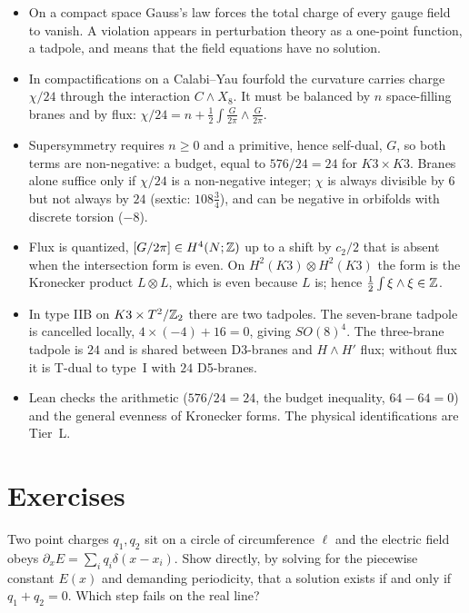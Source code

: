 \begin{summarybox}
\begin{itemize}[leftmargin=1.5em]
\item On a compact space Gauss's law forces the total charge of every gauge field to vanish.
 A violation appears in perturbation theory as a one-point function, a tadpole, and means
 that the field equations have no solution.
\item In compactifications on a Calabi--Yau fourfold the curvature carries charge
 $\chi/24$ through the interaction $C\wedge X_8$. It must be balanced by $n$ space-filling
 branes and by flux: $\chi/24=n+\tfrac12\int\frac G{2\pi}\wedge\frac G{2\pi}$.
\item Supersymmetry requires $n\ge0$ and a primitive, hence self-dual, $G$, so both terms are
 non-negative: a budget, equal to $576/24=24$ for $K3\times K3$. Branes alone suffice only if
 $\chi/24$ is a non-negative integer;
 $\chi$ is always divisible by $6$ but not always by $24$ (sextic: $108\tfrac34$), and can be
 negative in orbifolds with discrete torsion ($-8$).
\item Flux is quantized, $[G/2\pi]\in H^4(N;\mathbb{Z})$ up to a shift by $c_2/2$ that is absent when
 the intersection form is even. On $H^2(K3)\otimes H^2(K3)$ the form is the Kronecker product
 $L\otimes L$, which is even because $L$ is; hence $\tfrac12\int\xi\wedge\xi\in\mathbb{Z}$.
\item In type IIB on $K3\times T^2/\mathbb{Z}_2$ there are two tadpoles. The seven-brane tadpole is cancelled
 locally, $4\times(-4)+16=0$, giving $SO(8)^4$. The three-brane tadpole is $24$ and is shared
 between D3-branes and $H\wedge H'$ flux; without flux it is T-dual to type~I with $24$
 D5-branes.
\item Lean checks the arithmetic ($576/24=24$, the budget inequality, $64-64=0$) and the
 general evenness of Kronecker forms. The physical identifications are Tier~L.
\end{itemize}
\end{summarybox}

\section*{Exercises}

\begin{exercise}[$\star$]
Two point charges $q_1,q_2$ sit on a circle of circumference $\ell$ and the electric field
obeys $\partial_xE=\sum_iq_i\delta(x-x_i)$. Show directly, by solving for the piecewise
constant $E(x)$ and demanding periodicity, that a solution exists if and only if
$q_1+q_2=0$. Which step fails on the real line?
\end{exercise}

